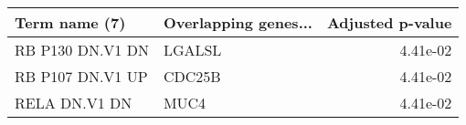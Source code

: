 \begin{tabular}{llr}
\toprule
   Term name (7) & Overlapping genes... &  Adjusted p-value \\
\midrule
RB P130 DN.V1 DN &               LGALSL &          4.41e-02 \\
RB P107 DN.V1 UP &               CDC25B &          4.41e-02 \\
   RELA DN.V1 DN &                 MUC4 &          4.41e-02 \\
\bottomrule
\end{tabular}
